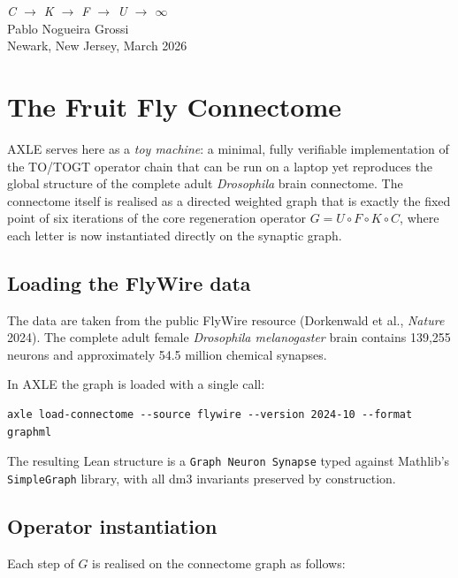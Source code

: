 \bigskip
\begin{flushright}
\textit{C \;$\to$\; K \;$\to$\; F \;$\to$\; U \;$\to$\; $\infty$}\\[0.3em]
Pablo Nogueira Grossi\\
Newark, New Jersey, March 2026
\end{flushright}

\chapter{The Fruit Fly Connectome}

AXLE serves here as a \emph{toy machine}: a minimal, fully verifiable implementation of the TO/TOGT operator chain that can be run on a laptop yet reproduces the global structure of the complete adult \emph{Drosophila} brain connectome. The connectome itself is realised as a directed weighted graph that is exactly the fixed point of six iterations of the core regeneration operator $G = U \circ F \circ K \circ C$, where each letter is now instantiated directly on the synaptic graph.

\section{Loading the FlyWire data}

The data are taken from the public FlyWire resource (Dorkenwald et al., \emph{Nature} 2024). The complete adult female \emph{Drosophila melanogaster} brain contains 139,255 neurons and approximately 54.5 million chemical synapses.

In AXLE the graph is loaded with a single call:
\begin{verbatim}
axle load-connectome --source flywire --version 2024-10 --format graphml
\end{verbatim}
The resulting Lean structure is a \texttt{Graph Neuron Synapse} typed against Mathlib's \texttt{SimpleGraph} library, with all dm3 invariants preserved by construction.

\section{Operator instantiation}

Each step of \(G\) is realised on the connectome graph as follows:

